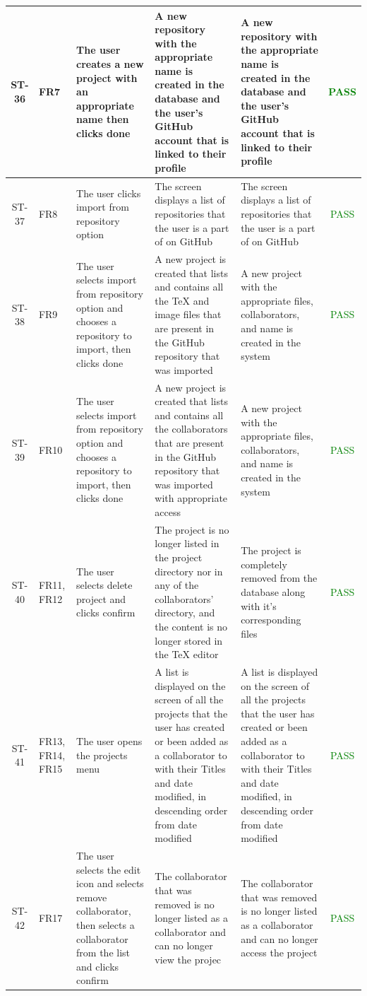 \documentclass[12pt, titlepage]{article}
\begin{document}
\begin{center}
\begin{longtable}{|c|p{1cm}|p{2.7cm}|p{3cm}|p{3cm}|c|}
        \hline
        ST-36 & FR7 & The user creates a new project with an appropriate name then clicks done & A new repository with the appropriate name is created in the database and the user's GitHub account that is linked to their profile & A new repository with the appropriate name is created in the database and the user's GitHub account that is linked to their profile  & \textcolor{green}{PASS}\\
        \hline
        ST-37 & FR8 & The user clicks import from repository option & The screen displays a list of repositories that the user is a part of on GitHub & The screen displays a list of repositories that the user is a part of on GitHub & \textcolor{green}{PASS}\\
        \hline
        ST-38 & FR9 & The user selects import from repository option and chooses a repository to import, then clicks done & A new project is created that lists and contains all the TeX and image files that are present in the GitHub repository that was imported & A new project with the appropriate files, collaborators, and name is created in the system  & \textcolor{green}{PASS}\\
        \hline
        ST-39 & FR10 & The user selects import from repository option and chooses a repository to import, then clicks done &  A new project is created that lists and contains all the collaborators that are present in the GitHub repository that was imported with appropriate access & A new project with the appropriate files, collaborators, and name is created in the system  & \textcolor{green}{PASS}\\
        \hline
        ST-40 & FR11, FR12 & The user selects delete project and clicks confirm & The project is no longer listed in the project directory nor in any of the collaborators' directory, and the content is no longer stored in the TeX editor & The project is completely removed from the database along with it's corresponding files & \textcolor{green}{PASS}\\
        \hline
        ST-41 & FR13, FR14, FR15 & The user opens the projects menu & A list is displayed on the screen of all the projects that the user has created or been added as a collaborator to with their Titles and date modified, in descending order from date modified & A list is displayed on the screen of all the projects that the user has created or been added as a collaborator to with their Titles and date modified, in descending order from date modified  & \textcolor{green}{PASS}\\
        \hline
        ST-42 & FR17 &  The user selects the edit icon and selects remove collaborator, then selects a collaborator from the list and clicks confirm & The collaborator that was removed is no longer listed as a collaborator and can no longer view the projec & The collaborator that was removed is no longer listed as a collaborator and can no longer access the project & \textcolor{green}{PASS}\\
        \hline
    \end{longtable}
\end{center}
\end{document}
